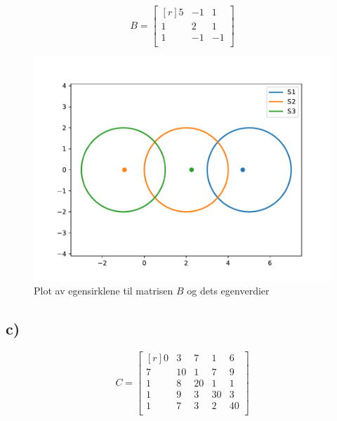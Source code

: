 \documentclass{article}
\begin{document}
    \[
        B = \begin{bmatrix*}[r]
         5 & -1 & 1 \\
         1 & 2 & 1 \\
         1 & -1 & -1 \\
        \end{bmatrix*}
    \]

      \begin{figure}[h!]
        \centering
        \includegraphics[scale = .4]{Oppgave_3B_plot.pdf}
        \caption{Plot av egensirklene til matrisen $ B $ og dets egenverdier}
        \label{fig:Matrix B}
      \end{figure}

    \subsection*{c)}

      \[
      C = 
      \begin{bmatrix*}[r]
       0 & 3 & 7 & 1 & 6 \\
       7 & 10 & 1 & 7 & 9 \\
       1 & 8 & 20 & 1 & 1 \\
       1 & 9 & 3 & 30 & 3 \\
       1 & 7 & 3 & 2 & 40 \\
      \end{bmatrix*}
      \]
\end{document}
